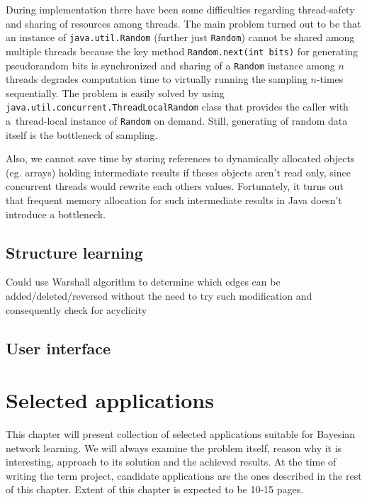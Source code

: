 \documentclass[english,cover]{fitthesis} %
\newcommand{\srccode}[1]{{\tt #1}}         %
\newcommand{\todo}[1]{{\color{red}#1}}
\begin{document}
\medskip
During implementation there have been some difficulties regarding thread-safety and sharing of resources among threads. The main problem turned out to be that an instance of \srccode{java.util.Random} (further just \srccode{Random}) cannot be shared among multiple threads because the key method \srccode{Random.next(int bits)} for generating pseudorandom bits is synchronized and sharing of a \srccode{Random} instance among $n$ threads degrades computation time to virtually running the sampling $n$-times sequentially. The problem is easily solved by using \srccode{java.util.concurrent.ThreadLocalRandom} class that provides the caller with a~thread-local instance of \srccode{Random} on demand. Still, generating of random data itself is the bottleneck of sampling.

Also, we cannot save time by storing references to dynamically allocated objects (eg. arrays) holding intermediate results if theses objects aren't read only, since concurrent threads would rewrite each others values. Fortunately, it turns out that frequent memory allocation for such intermediate results in Java doesn't introduce a bottleneck.







\section{Structure learning}
\todo{Could use Warshall algorithm to determine which edges can be added/deleted/reversed without the need to try such modification and consequently check for acyclicity}






\section{User interface}





















\chapter{Selected applications}
This chapter will present collection of selected applications suitable for Bayesian network learning. We will always examine the problem itself, reason why it is interesting, approach to its solution and the achieved results. At the time of writing the term project, candidate applications are the ones described in the rest of this chapter. Extent of this chapter is expected to be 10-15 pages.
\end{document}
